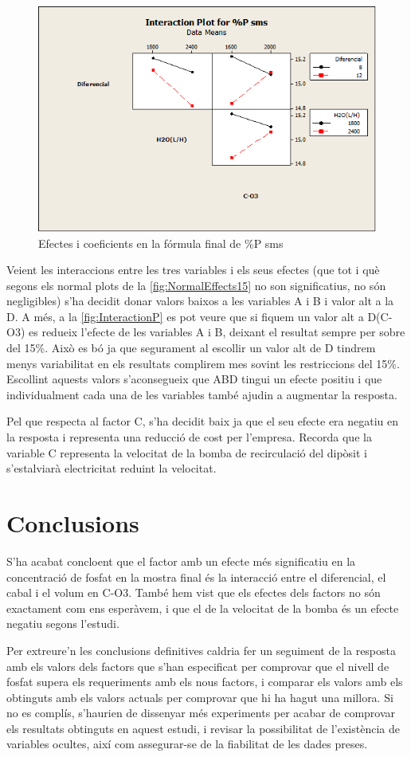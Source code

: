 \documentclass[a4paper]{article}
\begin{document}
\begin{figure}[H]
	\centering
	\includegraphics[width=.5\textwidth]{images/InteractionP}
	\caption{Efectes i coeficients en la fórmula final de \%P sms}
	\label{fig:InteractionP}
\end{figure} 

Veient les interaccions entre les tres variables i els seus efectes (que tot i què segons els normal plots de la \autoref{fig:NormalEffects15} no son significatius, no són negligibles) s’ha decidit donar valors baixos a les variables A i B i valor alt a la D. A més, a la \autoref{fig:InteractionP} es pot veure que si fiquem un valor alt a D(C-O3) es redueix l'efecte de les variables A i B, deixant el resultat sempre per sobre del 15\%. Això es bó ja que segurament al escollir un valor alt de D tindrem menys variabilitat en els resultats 	complirem mes sovint les restriccions del 15\%. Escollint aquests valors s’aconsegueix que ABD tingui un efecte positiu i que individualment cada una de les variables també ajudin a augmentar la resposta.

Pel que respecta al factor C, s’ha decidit baix ja que el seu efecte era negatiu en la resposta i representa una reducció de cost per l’empresa. Recorda que la variable C representa la velocitat de la bomba de recirculació del dipòsit i s’estalviarà electricitat reduint la velocitat. 

\section{Conclusions}
S'ha acabat concloent que el factor amb un efecte més significatiu en la concentració de fosfat en la mostra final és la interacció entre el diferencial, el cabal i el volum en C-O3. També hem vist que els efectes dels factors no són exactament com ens esperàvem, i que el de la velocitat de la bomba és un efecte negatiu segons l'estudi.

Per extreure'n les conclusions definitives caldria fer un seguiment de la resposta amb els valors dels factors que s'han especificat per comprovar que el nivell de fosfat supera els requeriments amb els nous factors, i comparar els valors amb els obtinguts amb els valors actuals per comprovar que hi ha hagut una millora. Si no es complís, s'haurien de dissenyar més experiments per acabar de comprovar els resultats obtinguts en aquest estudi, i revisar la possibilitat de l'existència de variables ocultes, així com assegurar-se de la fiabilitat de les dades preses.
\end{document}
